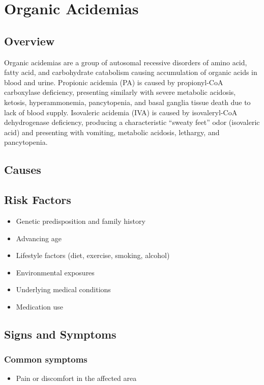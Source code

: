 \chapter{Organic Acidemias}
\label{sec:Organic Acidemias}

\section{Overview}
Organic acidemias are a group of autosomal recessive disorders of amino acid, fatty acid, and carbohydrate catabolism causing accumulation of organic acids in blood and urine. Propionic acidemia (PA) is caused by propionyl-CoA carboxylase deficiency, presenting similarly with severe metabolic acidosis, ketosis, hyperammonemia, pancytopenia, and basal ganglia tissue death due to lack of blood supply. Isovaleric acidemia (IVA) is caused by isovaleryl-CoA dehydrogenase deficiency, producing a characteristic ``sweaty feet'' odor (isovaleric acid) and presenting with vomiting, metabolic acidosis, lethargy, and pancytopenia.
\section{Causes}
\section{Risk Factors}

\begin{itemize}[noitemsep]
  \item Genetic predisposition and family history
  \item Advancing age
  \item Lifestyle factors (diet, exercise, smoking, alcohol)
  \item Environmental exposures
  \item Underlying medical conditions
  \item Medication use
\end{itemize}
\section{Signs and Symptoms}

\subsection{Common symptoms}
\begin{itemize}[noitemsep]
  \item Pain or discomfort in the affected area
  \end{itemize}

